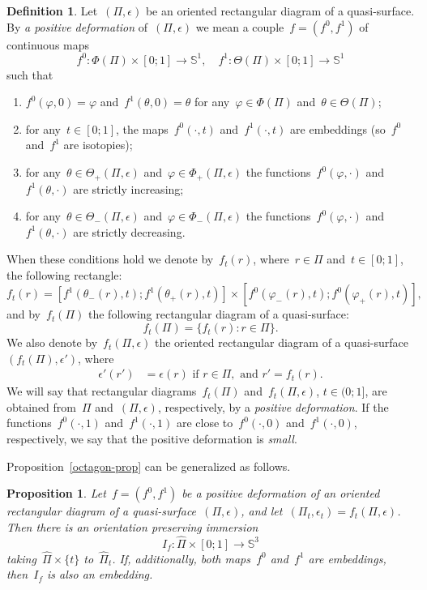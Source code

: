 \documentclass{amsart}
\theoremstyle{theorem}
\newtheorem{prop}[theo]{Proposition}
\theoremstyle{remark}
\theoremstyle{definition}
\newtheorem{defi}[theo]{Definition}
\numberwithin{equation}{section}
\numberwithin{figure}{section}
\begin{document}
\begin{defi}
Let~$(\Pi,\epsilon)$ be an oriented rectangular diagram of a quasi-surface. By \emph{a positive deformation}
of~$(\Pi,\epsilon)$ we mean a couple~$f=(f^0,f^1)$ of continuous maps
$$f^0:\Phi(\Pi)\times[0;1]\rightarrow\mathbb S^1,\quad f^1:\Theta(\Pi)\times[0;1]\rightarrow\mathbb S^1$$
such that
\begin{enumerate}
\item
$f^0(\varphi,0)=\varphi$ and~$f^1(\theta,0)=\theta$ for any~$\varphi\in\Phi(\Pi)$ and~$\theta\in\Theta(\Pi)$;
\item
for any~$t\in[0;1]$, the maps~$f^0(\cdot,t)$ and~$f^1(\cdot,t)$ are embeddings (so~$f^0$ and~$f^1$ are isotopies);
\item
for any~$\theta\in\Theta_+(\Pi,\epsilon)$ and~$\varphi\in\Phi_+(\Pi,\epsilon)$ the functions~$f^0(\varphi,\cdot)$
and~$f^1(\theta,\cdot)$ are strictly increasing;
\item
for any~$\theta\in\Theta_-(\Pi,\epsilon)$ and~$\varphi\in\Phi_-(\Pi,\epsilon)$ the functions~$f^0(\varphi,\cdot)$
and~$f^1(\theta,\cdot)$ are strictly decreasing.
\end{enumerate}
When these conditions hold we denote by~$f_t(r)$, where~$r\in\Pi$ and~$t\in[0;1]$,
the following rectangle:
$$f_t(r)=[f^1(\theta_-(r),t);f^1(\theta_+(r),t)]\times[f^0(\varphi_-(r),t);f^0(\varphi_+(r),t)],$$
and by~$f_t(\Pi)$
the following rectangular diagram of a quasi-surface:
$$f_t(\Pi)=\{f_t(r):r\in\Pi\}.$$
We also denote by~$f_t(\Pi,\epsilon)$ the oriented
rectangular diagram of a quasi-surface~$(f_t(\Pi),\epsilon')$, where
$$\begin{aligned}
\epsilon'(r')&=\epsilon(r)\text{ if }r\in\Pi,\text{ and }r'=f_t(r).
\end{aligned}$$
We will say that rectangular diagrams~$f_t(\Pi)$ and~$f_t(\Pi,\epsilon)$, $t\in(0;1]$, are obtained from~$\Pi$ and~$(\Pi,\epsilon)$,
respectively, by a \emph{positive deformation}.
If the functions~$f^0(\cdot,1)$ and~$f^1(\cdot,1)$ are close to~$f^0(\cdot,0)$ and~$f^1(\cdot,0)$, respectively,
we say that the positive deformation is \emph{small}.
\end{defi}

Proposition~\ref{octagon-prop} can be generalized as follows.

\begin{prop}\label{thickened_surface-prop}
Let~$f=(f^0,f^1)$ be a positive deformation of an oriented rectangular diagram of a quasi-surface~$(\Pi,\epsilon)$,
and let~$(\Pi_t,\epsilon_t)=f_t(\Pi,\epsilon)$. Then there is an orientation preserving immersion
$$I_f:\widehat\Pi\times[0;1]\rightarrow\mathbb S^3$$
taking~$\widehat\Pi\times\{t\}$ to~$\widehat\Pi_t$.
If, additionally, both maps~$f^0$ and~$f^1$ are embeddings,
then~$I_f$ is also an embedding.
\end{prop}
\end{document}

